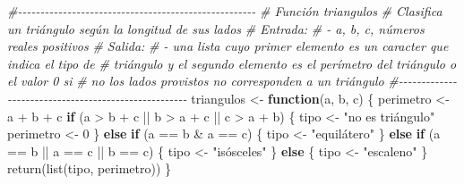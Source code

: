 \documentclass[
]{book}
\newenvironment{Shaded}{\begin{snugshade}}{\end{snugshade}}
\newcommand{\CommentTok}[1]{\textcolor[rgb]{0.56,0.35,0.01}{\textit{#1}}}
\newcommand{\ControlFlowTok}[1]{\textcolor[rgb]{0.13,0.29,0.53}{\textbf{#1}}}
\newcommand{\DecValTok}[1]{\textcolor[rgb]{0.00,0.00,0.81}{#1}}
\newcommand{\FunctionTok}[1]{\textcolor[rgb]{0.00,0.00,0.00}{#1}}
\newcommand{\NormalTok}[1]{#1}
\newcommand{\OtherTok}[1]{\textcolor[rgb]{0.56,0.35,0.01}{#1}}
\newcommand{\SpecialCharTok}[1]{\textcolor[rgb]{0.00,0.00,0.00}{#1}}
\newcommand{\StringTok}[1]{\textcolor[rgb]{0.31,0.60,0.02}{#1}}
\begin{document}
\begin{Shaded}
\begin{Highlighting}[]
\CommentTok{\#{-}{-}{-}{-}{-}{-}{-}{-}{-}{-}{-}{-}{-}{-}{-}{-}{-}{-}{-}{-}{-}{-}{-}{-}{-}{-}{-}{-}{-}{-}{-}{-}{-}{-}{-}{-}{-}{-}{-}{-}{-}{-}{-}{-}{-}{-}{-}{-}{-}{-}{-}{-}{-}}
\CommentTok{\# Función triangulos}
\CommentTok{\# Clasifica un triángulo según la longitud de sus lados}
\CommentTok{\# Entrada:}
\CommentTok{\#       {-} a, b, c, números reales positivos}
\CommentTok{\# Salida:}
\CommentTok{\#       {-} una lista cuyo primer elemento es un caracter que indica el tipo de}
\CommentTok{\#       triángulo y el segundo elemento es el perímetro del triángulo o el valor 0 si}
\CommentTok{\#       no los lados provistos no corresponden a un triángulo}
\CommentTok{\#{-}{-}{-}{-}{-}{-}{-}{-}{-}{-}{-}{-}{-}{-}{-}{-}{-}{-}{-}{-}{-}{-}{-}{-}{-}{-}{-}{-}{-}{-}{-}{-}{-}{-}{-}{-}{-}{-}{-}{-}{-}{-}{-}{-}{-}{-}{-}{-}{-}{-}{-}{-}{-}}
\NormalTok{triangulos }\OtherTok{\textless{}{-}} \ControlFlowTok{function}\NormalTok{(a, b, c) \{}
\NormalTok{    perimetro }\OtherTok{\textless{}{-}}\NormalTok{ a }\SpecialCharTok{+}\NormalTok{ b }\SpecialCharTok{+}\NormalTok{ c}
    \ControlFlowTok{if}\NormalTok{ (a }\SpecialCharTok{\textgreater{}}\NormalTok{ b }\SpecialCharTok{+}\NormalTok{ c }\SpecialCharTok{||}\NormalTok{ b }\SpecialCharTok{\textgreater{}}\NormalTok{ a }\SpecialCharTok{+}\NormalTok{ c }\SpecialCharTok{||}\NormalTok{ c }\SpecialCharTok{\textgreater{}}\NormalTok{ a }\SpecialCharTok{+}\NormalTok{ b) \{}
\NormalTok{        tipo }\OtherTok{\textless{}{-}} \StringTok{"no es triángulo"}
\NormalTok{        perimetro }\OtherTok{\textless{}{-}} \DecValTok{0}
\NormalTok{    \} }\ControlFlowTok{else} \ControlFlowTok{if}\NormalTok{ (a }\SpecialCharTok{==}\NormalTok{ b }\SpecialCharTok{\&}\NormalTok{ a }\SpecialCharTok{==}\NormalTok{ c) \{}
\NormalTok{        tipo }\OtherTok{\textless{}{-}} \StringTok{"equilátero"}
\NormalTok{    \} }\ControlFlowTok{else} \ControlFlowTok{if}\NormalTok{ (a }\SpecialCharTok{==}\NormalTok{ b }\SpecialCharTok{||}\NormalTok{ a }\SpecialCharTok{==}\NormalTok{ c }\SpecialCharTok{||}\NormalTok{ b }\SpecialCharTok{==}\NormalTok{ c) \{}
\NormalTok{        tipo }\OtherTok{\textless{}{-}} \StringTok{"isósceles"}
\NormalTok{    \} }\ControlFlowTok{else}\NormalTok{ \{}
\NormalTok{        tipo }\OtherTok{\textless{}{-}} \StringTok{"escaleno"}
\NormalTok{    \}}
    \FunctionTok{return}\NormalTok{(}\FunctionTok{list}\NormalTok{(tipo, perimetro))}
\NormalTok{\}}
\end{Highlighting}
\end{Shaded}
\end{document}
